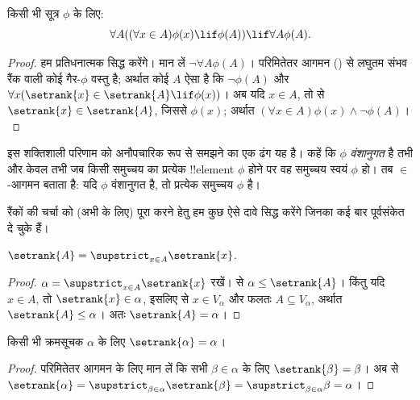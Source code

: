\documentclass[../../../include/open-logic-section]{subfiles}
\begin{document}
\begin{thm}[$\in$-आगमन योजना]
किसी भी सूत्र $\phi$ के लिए:
\[
	\forall A((\forall x \in A)\phi(x) \lif \phi(A)) \lif \forall A \phi(A).
\]
\end{thm}

\begin{proof}
हम प्रतिधनात्मक सिद्ध करेंगे। मान लें $\lnot \forall A \phi(A)$। परिमितेतर
आगमन () से लघुतम संभव रैंक वाली
कोई गैर-$\phi$ वस्तु है; अर्थात कोई $A$ ऐसा है कि $\lnot \phi(A)$ और
$\forall x(\setrank{x} \in \setrank{A} \lif \phi(x))$। अब यदि $x \in A$,
तो  से $\setrank{x} \in \setrank{A}$, जिससे
$\phi(x)$; अर्थात $(\forall x \in A)\phi(x) \land \lnot \phi(A)$।
\end{proof}\noindent
इस शक्तिशाली परिणाम को अनौपचारिक रूप से समझने का एक ढंग यह है। कहें कि
$\phi$ \emph{वंशानुगत} है तभी और केवल तभी जब किसी समुच्चय का प्रत्येक
!!{element} $\phi$ होने पर वह समुच्चय स्वयं $\phi$ हो। तब $\in$-आगमन बताता
है: यदि $\phi$ वंशानुगत है, तो प्रत्येक समुच्चय $\phi$ है।

रैंकों की चर्चा को (अभी के लिए) पूरा करने हेतु हम कुछ ऐसे दावे सिद्ध करेंगे
जिनका कई बार पूर्वसंकेत दे चुके हैं।

\begin{prop}
$\setrank{A} = \supstrict_{x \in A}\setrank{x}$.
\end{prop}

\begin{proof}
$\alpha = \supstrict_{x \in A}\setrank{x}$ रखें।
 से $\alpha \leq \setrank{A}$। किंतु यदि
$x \in A$, तो $\setrank{x} \in \alpha$, इसलिए
 से $x \in V_\alpha$ और फलतः
$A \subseteq V_\alpha$, अर्थात $\setrank{A} \leq \alpha$। अतः
$\setrank{A} = \alpha$।
\end{proof}

\begin{cor}
किसी भी क्रमसूचक $\alpha$ के लिए $\setrank{\alpha} = \alpha$।
\end{cor}

\begin{proof}
परिमितेतर आगमन के लिए मान लें कि सभी $\beta \in \alpha$ के लिए
$\setrank{\beta} = \beta$। अब  से
$\setrank{\alpha} = \supstrict_{\beta \in \alpha}\setrank{\beta}
= \supstrict_{\beta \in \alpha}\beta = \alpha$।
%
\end{proof}
\end{document}
